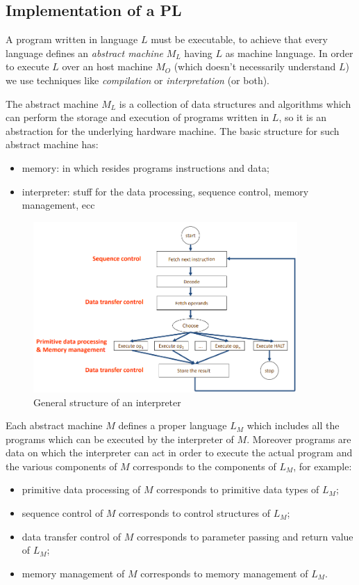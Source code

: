 \subsection{Implementation of a PL}
A program written in language $L$ must be executable, to achieve that every language defines an \emph{abstract machine} $M_L$ having $L$ as machine language.
In order to execute $L$ over an host machine $M_O$ (which doesn't necessarily understand $L$) we use techniques like \emph{compilation} or \emph{interpretation} (or both).

The abstract machine $M_L$ is a collection of data structures and algorithms which can perform the storage and execution of programs written in $L$, so it is an abstraction for the underlying hardware machine.
The basic structure for such abstract machine has:
\begin{itemize}
    \item memory: in which resides programs instructions and data;
    \item interpreter: stuff for the data processing, sequence control, memory management, ecc
\end{itemize}

\begin{figure}[H]
    \centering
    \includegraphics[width=380px]{images/1_Introduction/interpreter.png}
    \caption{General structure of an interpreter}
\end{figure}

Each abstract machine $M$ defines a proper language $L_M$ which includes all the programs which can be executed by the interpreter of $M$.
Moreover programs are data on which the interpreter can act in order to execute the actual program and the various components of $M$ corresponds to the components of $L_M$, for example:
\begin{itemize}
    \item primitive data processing of $M$ corresponds to primitive data types of $L_M$;
    \item sequence control of $M$ corresponds to control structures of $L_M$;
    \item data transfer control of $M$ corresponds to parameter passing and return value of $L_M$;
    \item memory management of $M$ corresponds to memory management of $L_M$.
\end{itemize}

